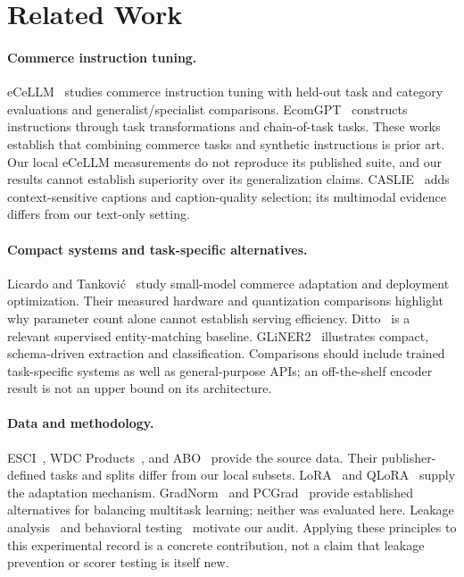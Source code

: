 \section{Related Work}
\paragraph{Commerce instruction tuning.}
eCeLLM~\cite{ecellm} studies commerce instruction tuning with held-out task and category evaluations and generalist/specialist comparisons. EcomGPT~\cite{ecomgpt} constructs instructions through task transformations and chain-of-task tasks. These works establish that combining commerce tasks and synthetic instructions is prior art. Our local eCeLLM measurements do not reproduce its published suite, and our results cannot establish superiority over its generalization claims. CASLIE~\cite{caslie} adds context-sensitive captions and caption-quality selection; its multimodal evidence differs from our text-only setting.

\paragraph{Compact systems and task-specific alternatives.}
Licardo and Tankovi\'{c}~\cite{tradeoffs} study small-model commerce adaptation and deployment optimization. Their measured hardware and quantization comparisons highlight why parameter count alone cannot establish serving efficiency. Ditto~\cite{ditto} is a relevant supervised entity-matching baseline. GLiNER2~\cite{gliner2} illustrates compact, schema-driven extraction and classification. Comparisons should include trained task-specific systems as well as general-purpose APIs; an off-the-shelf encoder result is not an upper bound on its architecture.

\paragraph{Data and methodology.}
ESCI~\cite{esci}, WDC Products~\cite{wdcproducts}, and ABO~\cite{abo} provide the source data. Their publisher-defined tasks and splits differ from our local subsets. LoRA~\cite{lora} and QLoRA~\cite{qlora} supply the adaptation mechanism. GradNorm~\cite{gradnorm} and PCGrad~\cite{pcgrad} provide established alternatives for balancing multitask learning; neither was evaluated here. Leakage analysis~\cite{leakage} and behavioral testing~\cite{checklist} motivate our audit. Applying these principles to this experimental record is a concrete contribution, not a claim that leakage prevention or scorer testing is itself new.


